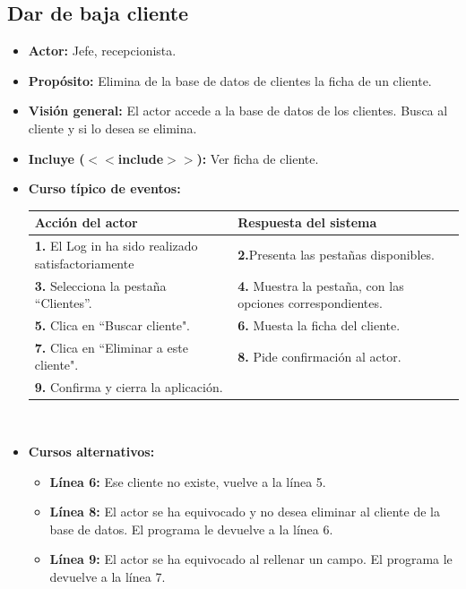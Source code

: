 \documentclass[spanish,a4paper,11pt, twoside]{report}	%
\begin{document}
	\subsection{Dar de baja cliente} 
			\begin{itemize}
			\item \textbf{Actor:} Jefe, recepcionista.
			\item \textbf{Propósito:} Elimina de la base de datos de clientes la ficha de un cliente.
			\item \textbf{Visión general:} El actor accede a la base de datos de los clientes.  Busca al cliente y si lo desea se elimina.
  			\item \textbf{Incluye ($<<$include$>>$):} Ver ficha de cliente.
			\item \textbf{Curso típico de eventos:} 	\\
				\begin{tabular}{|p{6cm}||p{6cm}|}
					\hline
					\textbf{Acción del actor} & \textbf{Respuesta del sistema} \\ \hline \hline
					\textbf{1.} El Log in ha sido realizado satisfactoriamente & \textbf{2.}Presenta las pestañas disponibles.\\ \hline 
					\textbf{3.} Selecciona la pestaña “Clientes”. & \textbf{4.} Muestra la pestaña, con las opciones correspondientes. \\ \hline
					\textbf{5.} Clica en “Buscar cliente".	& \textbf{6.} Muesta la ficha del cliente. \\ \hline
					\textbf{7.} Clica en “Eliminar a este cliente". & \textbf{8.} Pide confirmación al actor.\\ \hline
					\textbf{9.} Confirma y cierra la aplicación. & \textbf{} \\ \hline
				\end{tabular}
			\\
			\item \textbf{Cursos alternativos:} 
			\begin{itemize}
			\item  \textbf{Línea 6:} Ese cliente no existe, vuelve a la línea 5.
			\item  \textbf{Línea 8:} El actor se ha equivocado y no desea eliminar al cliente de la base de datos. El programa le devuelve a la línea 6.
			\item  \textbf{Línea 9:} El actor se ha equivocado al rellenar un campo. El programa le devuelve a la línea 7.
			\end {itemize}
		\end{itemize}
\end{document}
